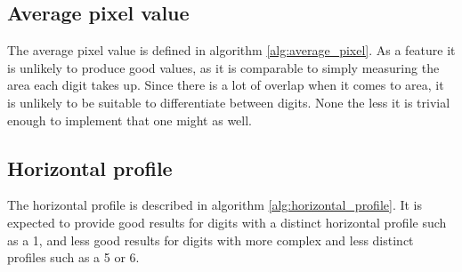 \documentclass[a4paper]{scrreprt}
\newcommand{\var}[1]{\textit{#1}}
\begin{document}
\subsection{Average pixel value}

The average pixel value is defined in algorithm \ref{alg:average_pixel}. As a
feature it is unlikely to produce good values, as it is comparable to simply
measuring the area each digit takes up. Since there is a lot of overlap when it
comes to area, it is unlikely to be suitable to differentiate between digits.
None the less it is trivial enough to implement that one might as well.


\subsection{Horizontal profile}

The horizontal profile is described in algorithm \ref{alg:horizontal_profile}.
It is expected to provide good results for digits with a distinct horizontal
profile such as a 1, and less good results for digits with more complex and
less distinct profiles such as a 5 or 6.
\end{document}
